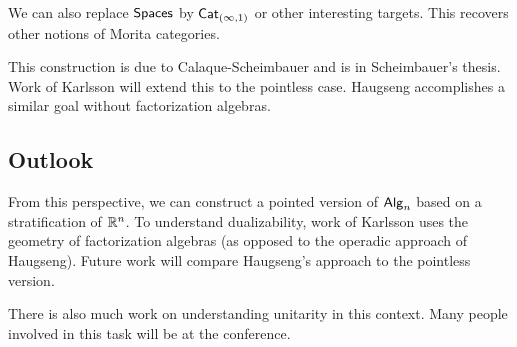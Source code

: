 We can also replace $\mathsf{Spaces}$ by $\mathsf{Cat}_{(\infty,1)}$ or other interesting targets.
This recovers other notions of Morita categories.

This construction is due to Calaque-Scheimbauer and is in Scheimbauer's thesis.
Work of Karlsson will extend this to the pointless case.
Haugseng accomplishes a similar goal without factorization algebras.

\subsection{Outlook}

From this perspective, we can construct a pointed version of $\mathsf{Alg}_n$ based on a stratification of $\mathbb{R}^n$.
To understand dualizability, work of Karlsson uses the geometry of factorization algebras (as opposed to the operadic approach of Haugseng).
Future work will compare Haugseng's approach to the pointless version.

There is also much work on understanding unitarity in this context.
Many people involved in this task will be at the conference.
